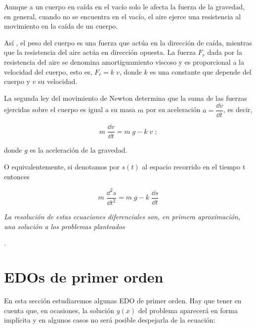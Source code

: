 \begin{small}
Aunque a un cuerpo en caída en el vacío solo le afecta la fuerza de la gravedad, en general, cuando no se encuentra en el vacío, el aire ejerce una resistencia al movimiento en la caída de un cuerpo. 
   
   Así , el peso del cuerpo es una fuerza que actúa en la dirección de  caída, mientras que la resistencia del aire actúa en dirección opuesta. La fuerza $F_r$ dada por la resistencia del aire se denomina amortiguamiento viscoso y es proporcional a la velocidad del cuerpo, esto es, $F_r = k\; v$, donde $k$ es una constante que depende del cuerpo y $v$ su velocidad. 
   
	La segunda ley del movimiento de Newton determina que la suma de las fuerzas ejercidas sobre el cuerpo es igual a su masa $m$ por su aceleración $a=\dfrac {\dd v}{\dd t}$, es decir, 
   
\begin{equation*}
	m\; \dfrac {\dd v}{\dd t} = m\; g - k\; v\;;
\end{equation*} 
   
donde $g$ es la aceleración de la gravedad.
   
   O equivalentemente, si denotamos por $s(t)$ al espacio recorrido en el tiempo t entonces 
   
 \begin{equation*}
 	m\; \dfrac {\dd^2 s}{\dd t^2} = m\; g - k\; \dfrac {\dd s}{\dd t}
 \end{equation*} 
 
 \vspace{3mm}
 
 \emph{La resolución de estas ecuaciones diferenciales son, en primera aproximación, una solución a los problemas planteados}
 \end{small}\normalsize{.}
 
 \section{EDOs de primer orden}
 
\normalsize{En} esta sección estudiaremos algunas EDO de primer orden. Hay que tener en cuenta que, en ocasiones, la solución $y(x)$ del problema aparecerá en forma implícita y en algunos casos no será posible despejarla de la ecuación:

